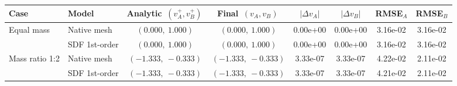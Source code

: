 \begin{tabular}{llcccccc}
\toprule
Case & Model & Analytic $\,(v_A^+,v_B^+)\,$ & Final $\,(v_A,v_B)\,$ & $|\Delta v_A|$ & $|\Delta v_B|$ & RMSE$_A$ & RMSE$_B$ \\
\midrule
Equal mass & Native mesh & $(0.000,\ 1.000)$ & $(0.000,\ 1.000)$ & 0.00e+00 & 0.00e+00 & 3.16e-02 & 3.16e-02 \\
 & SDF 1st-order & $(0.000,\ 1.000)$ & $(0.000,\ 1.000)$ & 0.00e+00 & 0.00e+00 & 3.16e-02 & 3.16e-02 \\
\midrule
Mass ratio 1:2 & Native mesh & $(-1.333,\ -0.333)$ & $(-1.333,\ -0.333)$ & 3.33e-07 & 3.33e-07 & 4.22e-02 & 2.11e-02 \\
 & SDF 1st-order & $(-1.333,\ -0.333)$ & $(-1.333,\ -0.333)$ & 3.33e-07 & 3.33e-07 & 4.21e-02 & 2.11e-02 \\
\bottomrule
\end{tabular}

